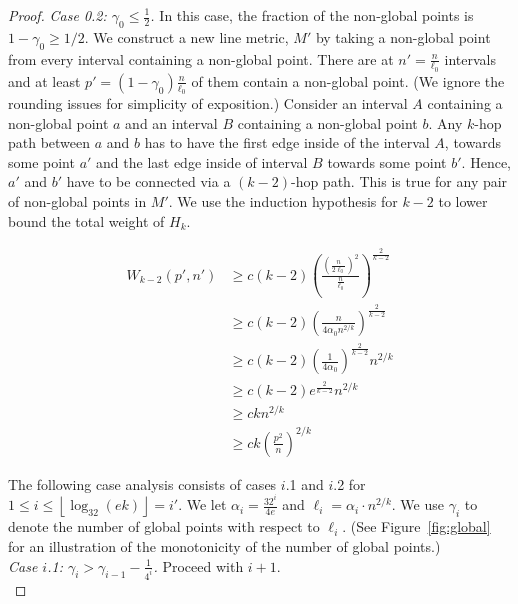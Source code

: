 \documentclass[11pt,english]{article}
\newcommand{\floor}[1]{\ensuremath{\left\lfloor#1\right\rfloor}}
\begin{document}
\begin{proof}
\noindent\textit{Case 0.2: $\gamma_0 \le \frac{1}{2}$.} In this case, the fraction of the non-global points is $1-\gamma_0 \ge 1/2$. We construct a new line metric, $M'$ by taking a non-global point from every interval containing a non-global point. There are at $n'= \frac{n}{\ell_0}$ intervals and at least $p'=(1-\gamma_0)\frac{n}{\ell_0}$ of them contain a non-global point. (We ignore the rounding issues for simplicity of exposition.) Consider an interval $A$ containing a non-global point $a$ and an interval $B$ containing a non-global point $b$. Any $k$-hop path between $a$ and $b$ has to have the first edge inside of the interval $A$, towards some point $a'$ and the last edge inside of interval $B$ towards some point $b'$. Hence, $a'$ and $b'$ have to be connected via a $(k-2)$-hop path. This is true for any pair of non-global points in $M'$. We use the induction hypothesis for $k-2$ to lower bound the total weight of $H_k$.

\begin{align*}
W_{k-2}(p', n') &\ge c(k-2)\left(\frac{\left(\frac{n}{2\ell_0}\right)^2}{\frac{n}{\ell_0}} \right)^{\frac{2}{k-2}}\\
&\ge c(k-2)\left(\frac{n}{4\alpha_0 n^{2/k}} \right)^{\frac{2}{k-2}}\\
&\ge c(k-2)\left(\frac{1}{4\alpha_0}\right)^{\frac{2}{k-2}}n^{2/k}\\
&\ge c(k-2)e^{\frac{2}{k-2}}n^{2/k}\\
&\ge ckn^{2/k}\\
&\ge ck\left(\frac{p^2}{n}\right)^{2/k}
\end{align*}

The following case analysis consists of cases $i$.1 and $i$.2 for $1 \le i \le \floor{\log_{32}(ek)}=i'$. We let $\alpha_i = \frac{32^i}{4e}$ and $\ell_i = \alpha_i \cdot n^{2/k}$. We use $\gamma_i$ to denote the number of global points with respect to $\ell_i$.
(See Figure~\ref{fig:global} for an illustration of the monotonicity of the number of global points.)\\

\noindent\textit{Case $i$.1: $\gamma_i > \gamma_{i-1}-\frac{1}{4^{i}}$.} Proceed with $i+1$.\\


\end{proof}
\end{document}

